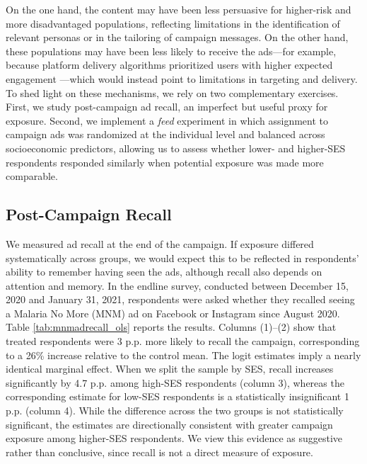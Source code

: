 On the one hand, the content may have been less persuasive for higher-risk and more disadvantaged populations, reflecting limitations in the identification of relevant personas or in the tailoring of campaign messages. On the other hand, these populations may have been less likely to receive the ads---for example, because platform delivery algorithms prioritized users with higher expected engagement \citep{lambrecht2019algorithmic,sapiezynski2022algorithms}---which would instead point to limitations in targeting and delivery. To shed light on these mechanisms, we rely on two complementary exercises. First, we study post-campaign ad recall, an imperfect but useful proxy for exposure. Second, we implement a \textit{feed} experiment in which assignment to campaign ads was randomized at the individual level and balanced across socioeconomic predictors, allowing us to assess whether lower- and higher-SES respondents responded similarly when potential exposure was made more comparable.





\subsection{Post-Campaign Recall}

We measured ad recall at the end of the campaign. If exposure differed systematically across groups, we would expect this to be reflected in respondents' ability to remember having seen the ads, although recall also depends on attention and memory. In the endline survey, conducted between December 15, 2020 and January 31, 2021, respondents were asked whether they recalled seeing a Malaria No More (MNM) ad on Facebook or Instagram since August 2020. Table \ref{tab:mnmadrecall_ols} reports the results. Columns (1)--(2) show that treated respondents were 3 p.p. more likely to recall the campaign, corresponding to a 26\% increase relative to the control mean. The logit estimates imply a nearly identical marginal effect. When we split the sample by SES, recall increases significantly by 4.7 p.p. among high-SES respondents (column 3), whereas the corresponding estimate for low-SES respondents is a statistically insignificant 1 p.p. (column 4). While the difference across the two groups is not statistically significant, the estimates are directionally consistent with greater campaign exposure among higher-SES respondents. We view this evidence as suggestive rather than conclusive, since recall is not a direct measure of exposure.


